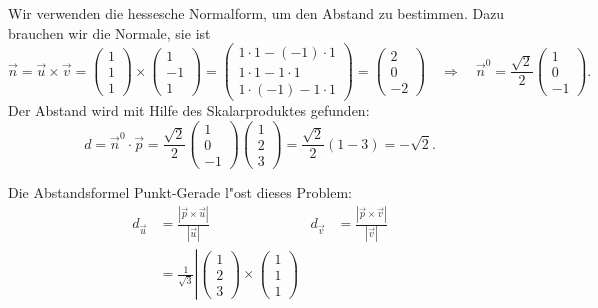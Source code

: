 \begin{loesung}
\begin{teilaufgaben}
\item Wir verwenden die hessesche Normalform, um den Abstand zu bestimmen.
Dazu brauchen wir die Normale, sie ist
\[
\vec n=\vec u\times \vec v=
\begin{pmatrix}1\\1\\1\end{pmatrix}
\times
\begin{pmatrix}1\\-1\\1\end{pmatrix}
=
\begin{pmatrix}
1\cdot 1-(-1)\cdot 1\\
1\cdot 1-1\cdot 1\\
1\cdot (-1)-1\cdot 1
\end{pmatrix}
=
\begin{pmatrix}
2\\0\\-2
\end{pmatrix}
\quad\Rightarrow\quad
\vec{n}^0
=
\frac{\sqrt{2}}2
\begin{pmatrix}1\\0\\-1\end{pmatrix}.
\]
Der Abstand wird mit Hilfe des Skalarproduktes gefunden:
\[
d
=
\vec{n}^0\cdot \vec{p}
=
\frac{\sqrt{2}}2
\begin{pmatrix}1\\0\\-1\end{pmatrix}
\begin{pmatrix}1\\2\\3\end{pmatrix}
=
\frac{\sqrt{2}}2(1-3)=-\sqrt{2}.
\]
\item
Die Abstandsformel Punkt-Gerade l"ost dieses Problem:
\begin{align*}
d_{\vec{u}}
&=
\frac{|\vec{p}\times \vec{u}|}{|\vec{u}|}
&
d_{\vec{v}}
&=
\frac{|\vec{p}\times \vec{v}|}{|\vec{v}|}
\\
&=
\frac{1}{\sqrt{3}}
\left|
\begin{pmatrix}1\\2\\3\end{pmatrix}
\times
\begin{pmatrix}1\\1\\1\end{pmatrix}

\end{align*}
\end{teilaufgaben}
\end{loesung}
